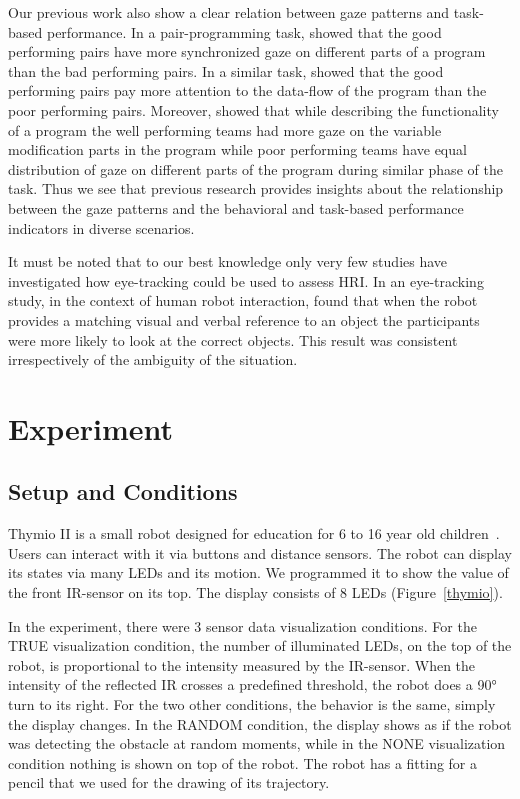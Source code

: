 \documentclass{sig-alternate}
\begin{document}
Our previous work also show a clear relation between gaze patterns and
task-based performance. In a pair-programming task, \cite{jermann2012effects}
showed that the good performing pairs have more synchronized gaze on different
parts of a program than the bad performing pairs. In a similar task,
\cite{sharma2012gaze} showed that the good performing pairs pay more attention
to the data-flow of the program than the poor performing pairs. Moreover,
\cite{sharma2013understanding} showed that while describing the functionality of
a program the well performing teams had more gaze on the variable modification
parts in the program while poor performing teams have equal distribution of gaze
on different parts of the program during similar phase of the task.  Thus we see
that previous research provides insights about the relationship between the gaze
patterns and the behavioral and task-based performance indicators in diverse
scenarios.

It must be noted that to our best knowledge only very few studies have
investigated how eye-tracking could be used to assess HRI. In an eye-tracking
study, in the context of human robot interaction, \cite{staudte2009visual} found
that when the robot provides a matching visual and verbal reference to an object
the participants were more likely to look at the correct objects. This result
was consistent irrespectively of the ambiguity of the situation.



\section{Experiment}

\subsection{Setup and Conditions}

Thymio II is a small robot designed for education for 6 to 16 year old
children~\cite{magnenat2012programming, riedo2012two}. Users can interact with
it via buttons and distance sensors. The robot can display its states via many
LEDs and its motion. We programmed it to show the value of the front IR-sensor
on its top. The display consists of 8 LEDs (Figure~\ref{thymio}).

In the experiment, there were 3 sensor data visualization conditions.  For the
TRUE visualization condition, the number of illuminated LEDs, on the top of the
robot, is proportional to the intensity measured by the IR-sensor. When the
intensity of the reflected IR crosses a predefined threshold, the robot does a
90° turn to its right. For the two other conditions, the behavior is the same,
simply the display changes. In the RANDOM condition, the display shows as if the
robot was detecting the obstacle at random moments, while in the NONE
visualization condition nothing is shown on top of the robot. The robot has a
fitting for a pencil that we used for the drawing of its trajectory.
\end{document}
